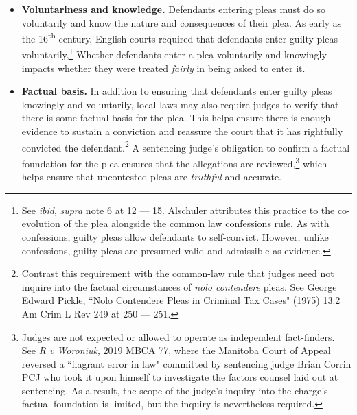 \begin{itemize}
\item \textbf{Voluntariness and knowledge.} Defendants entering pleas must do so voluntarily and know the nature and consequences of their plea. As early as the 16\textsuperscript{th} century, English courts required that defendants enter guilty pleas voluntarily,\footnote{See \textit{ibid}, \textit{supra} note 6 at 12 — 15. Alschuler attributes this practice to the co-evolution of the plea alongside the common law confessions rule. As with confessions, guilty pleas allow defendants to self-convict. However, unlike confessions, guilty pleas are presumed valid and admissible as evidence.} Whether defendants enter a plea voluntarily and knowingly impacts whether they were treated \textit{fairly} in being asked to enter it.
\item \textbf{Factual basis.} In addition to ensuring that defendants enter guilty pleas knowingly and voluntarily, local laws may also require judges to verify that there is some factual basis for the plea. This helps ensure there is enough evidence to sustain a conviction and reassure the court that it has rightfully convicted the defendant.\footnote{Contrast this requirement with the common-law rule that judges need not inquire into the factual circumstances of \textit{nolo contendere} pleas. See George Edward Pickle, ``Nolo Contendere Pleas in Criminal Tax Cases" (1975) 13:2 Am Crim L Rev 249 at 250 — 251.} A sentencing judge's obligation to confirm a factual foundation for the plea ensures that the allegations are reviewed,\footnote{Judges are not expected or allowed to operate as independent fact-finders. See \textit{R v Woroniuk}, 2019 MBCA 77, where the Manitoba Court of Appeal reversed a ``flagrant error in law" committed by sentencing judge Brian Corrin PCJ who took it upon himself to investigate the factors counsel laid out at sentencing. As a result, the scope of the judge's inquiry into the charge's factual foundation is limited, but the inquiry is nevertheless required.} which helps ensure that uncontested pleas are \textit{truthful} and accurate.

\end{itemize}
